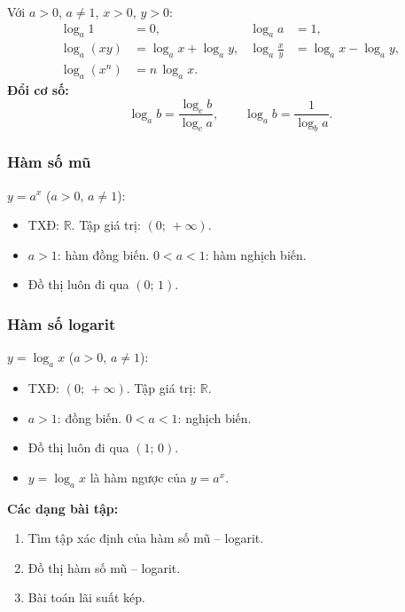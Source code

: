 \documentclass[12pt,a4paper]{article}
\begin{document}
\begin{congthuc}[title={Tính chất logarit}]
  Với $a > 0$, $a \ne 1$, $x > 0$, $y > 0$:
  \begin{align}
    \log_a 1 &= 0, & \log_a a &= 1, \\
    \log_a(xy) &= \log_a x + \log_a y, &
    \log_a\frac{x}{y} &= \log_a x - \log_a y, \\
    \log_a(x^n) &= n\,\log_a x.
  \end{align}
  \textbf{Đổi cơ số:}
  \[
    \log_a b = \frac{\log_c b}{\log_c a},\qquad
    \log_a b = \frac{1}{\log_b a}.
  \]
\end{congthuc}

\subsubsection{Hàm số mũ}

\begin{dinhnghia}
  $y = a^x$ \;($a > 0$, $a \ne 1$):
  \begin{itemize}
    \item TXĐ: $\mathbb{R}$. \quad Tập giá trị: $(0;\,+\infty)$.
    \item $a > 1$: hàm đồng biến. \quad $0 < a < 1$: hàm nghịch biến.
    \item Đồ thị luôn đi qua $(0;\,1)$.
  \end{itemize}
\end{dinhnghia}

\subsubsection{Hàm số logarit}

\begin{dinhnghia}
  $y = \log_a x$ \;($a > 0$, $a \ne 1$):
  \begin{itemize}
    \item TXĐ: $(0;\,+\infty)$. \quad Tập giá trị: $\mathbb{R}$.
    \item $a > 1$: đồng biến. \quad $0 < a < 1$: nghịch biến.
    \item Đồ thị luôn đi qua $(1;\,0)$.
    \item $y = \log_a x$ là hàm ngược của $y = a^x$.
  \end{itemize}
\end{dinhnghia}

\medskip\noindent\textbf{Các dạng bài tập:}
\begin{enumerate}[label=\textbf{Dạng \arabic*:}, leftmargin=*, align=left]
  \item Tìm tập xác định của hàm số mũ -- logarit.
  \item Đồ thị hàm số mũ -- logarit.
  \item Bài toán lãi suất kép.
\end{enumerate}
\end{document}
